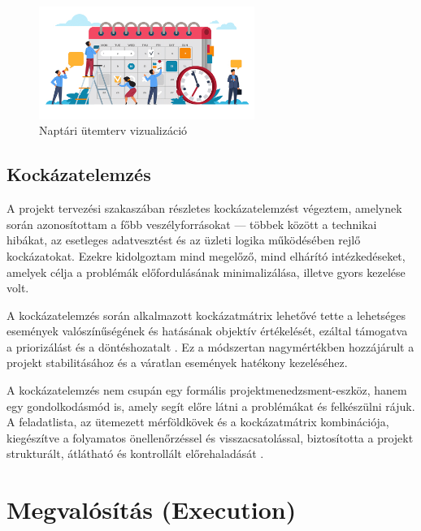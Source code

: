 \begin{figure}[H]
    \centering
    \includegraphics[width=70mm, keepaspectratio]{figures/plan.png}
    \caption{Naptári ütemterv vizualizáció}
    \label{fig:plan}
\end{figure}

\subsection{Kockázatelemzés}

A projekt tervezési szakaszában részletes kockázatelemzést végeztem, amelynek során azonosítottam a főbb veszélyforrásokat — többek között a technikai hibákat, 
az esetleges adatvesztést és az üzleti logika működésében rejlő kockázatokat.  
Ezekre kidolgoztam mind megelőző, mind elhárító intézkedéseket, amelyek célja a problémák előfordulásának minimalizálása, illetve gyors kezelése volt.  

A kockázatelemzés során alkalmazott kockázatmátrix lehetővé tette a lehetséges események valószínűségének és hatásának objektív értékelését, 
ezáltal támogatva a priorizálást és a döntéshozatalt \cite{Kovacs2016,Kaposi2019}.  
Ez a módszertan nagymértékben hozzájárult a projekt stabilitásához és a váratlan események hatékony kezeléséhez.  

A kockázatelemzés nem csupán egy formális projektmenedzsment-eszköz, hanem egy gondolkodásmód is, 
amely segít előre látni a problémákat és felkészülni rájuk.  
A feladatlista, az ütemezett mérföldkövek és a kockázatmátrix kombinációja, kiegészítve a folyamatos önellenőrzéssel és 
visszacsatolással, biztosította a projekt strukturált, átlátható és kontrollált előrehaladását \cite{Hajdu2014,Szalay2018}.

\section{Megvalósítás (Execution)}

